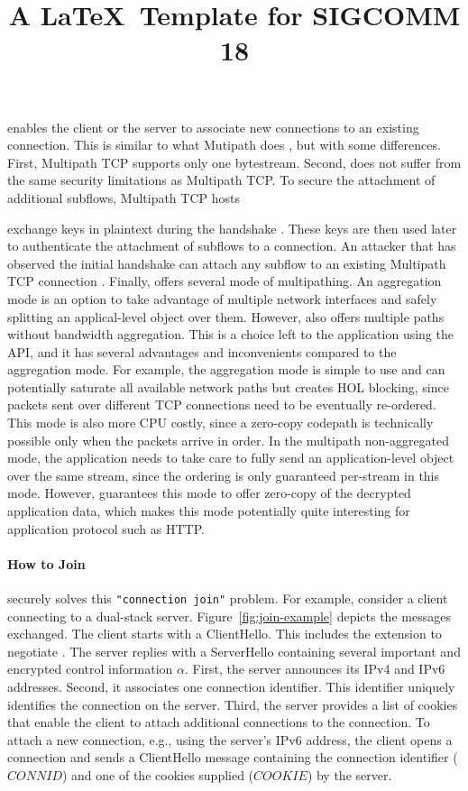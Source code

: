 \tcpls enables the client or the server to associate new \tcp connections to an
existing \tcpls connection. This is similar to what Mutipath \tcp does
\cite{raiciu2012hard,rfc6824}, but with some differences. First, Multipath TCP
supports only one bytestream.  Second, \tcpls does not suffer from the same
security limitations as Multipath TCP. To secure the attachment of additional
subflows, Multipath TCP hosts \title{A \LaTeX\ Template for SIGCOMM 18} exchange
keys in plaintext during the handshake \cite{rfc6824, rfc8684}.  These keys are
then used later to authenticate the attachment of subflows to a connection. An
attacker that has observed the initial handshake can attach any subflow to an
existing Multipath TCP connection \cite{rfc6181}. Finally,  \tcpls offers
several mode of multipathing. An aggregation mode is an option to take advantage of
multiple network interfaces and safely splitting an applical-level object over
them. However, \tcpls also offers multiple paths without bandwidth aggregation.
This is a choice left to the application using the API, and it has several
advantages and inconvenients compared to the aggregation mode. For example, the
aggregation mode is simple to use and can potentially saturate all available
network paths but creates HOL blocking, since packets sent over different TCP
connections need to be eventually re-ordered. This mode is also more CPU
costly, since a zero-copy codepath is technically possible only when the packets
arrive in order. In the multipath non-aggregated mode, the application needs to
take care to fully send an application-level object over the same stream, since
the ordering is only guaranteed per-stream in this mode. However, \tcpls
guarantees this mode to offer zero-copy of the decrypted application data, which
makes this mode potentially quite interesting for application protocol such as
HTTP.

\paragraph*{How to Join}

\tcpls securely solves this \texttt{"connection join"} problem. For example, consider a
client connecting to a dual-stack server. Figure~\ref{fig:join-example} depicts
the \tls messages exchanged.  The client starts with a ClientHello. This includes
the \tcpls extension to negotiate \tcpls. The server replies with a ServerHello
containing several important and encrypted control information $\alpha$. First, the server announces
its IPv4 and IPv6 addresses. Second, it associates one connection identifier.
This identifier uniquely identifies the connection on the server. Third, the
server provides a list of cookies that enable the client to attach additional
\tcp connections to the \tcpls connection. To attach a new connection, e.g., using
the server's IPv6 address, the client opens a \tcp connection and sends a
ClientHello message containing the connection identifier ($CONNID$) and one of the cookies
supplied ($COOKIE$) by the server.

